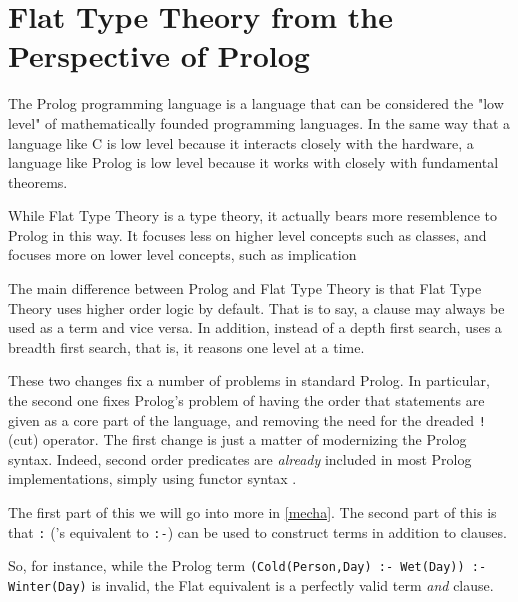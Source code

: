 \section{Flat Type Theory from the Perspective of Prolog}

The Prolog programming language is a language that can be considered the "low level" of mathematically founded programming languages.
In the same way that a language like C is low level because it interacts closely with the hardware, a language like Prolog is low level because it works with closely with fundamental theorems.

While Flat Type Theory is a type theory, it actually bears more resemblence to Prolog in this way.
It focuses less on higher level concepts such as classes, and focuses more on lower level concepts, such as implication

The main difference between Prolog and Flat Type Theory is that Flat Type Theory uses higher order logic by default.
That is to say, a clause may always be used as a term and vice versa.
In addition, instead of a depth first search, \this uses a breadth first search, that is, it reasons one level at a time.

These two changes fix a number of problems in standard Prolog. 
In particular, the second one fixes Prolog's problem of having the order that statements are given as a core part of the language, and removing the need for the dreaded \verb|!| (cut) operator. \cite{swipl}
The first change is just a matter of modernizing the Prolog syntax. 
Indeed, second order predicates are \emph{already} included in most Prolog implementations, simply using functor syntax \cite{flach2022simply}.

The first part of this we will go into more in \ref{mecha}.
The second part of this is that \verb|:| (\this 's equivalent to \verb|:-|) can be used to construct terms in addition to clauses.

So, for instance, while the Prolog term \verb|(Cold(Person,Day) :- Wet(Day)) :- Winter(Day)| is invalid, the Flat equivalent is a perfectly valid term \emph{and} clause.